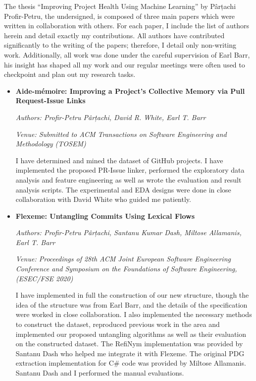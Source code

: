 The thesis “Improving Project Health Using Machine Learning” by Pârțachi
Profir-Petru, the undersigned, is composed of three main papers which were
written in collaboration with others. For each paper, I include the list of
authors herein and detail exactly my contributions. All authors have contributed
significantly to the writing of the papers; therefore, I detail only non-writing
work. Additionally, all work was done under the careful supervision of Earl
Barr, his insight has shaped all my work and our regular meetings were often
used to checkpoint and plan out my research tasks.

\begin{itemize}[leftmargin=*]
    \item[] \textbf{Aide-mémoire: Improving a Project’s Collective Memory via
Pull Request-Issue Links} 
    
    \noindent\emph{Authors: Profir-Petru Pârțachi, David R. White, Earl T. Barr}
    
    \noindent\emph{Venue: Submitted to ACM Transactions on Software Engineering
    and Methodology (TOSEM)}

    \noindent I have determined and mined the dataset of GitHub projects. I have
    implemented the proposed PR-Issue linker, performed the exploratory data
    analysis and feature engineering as well as wrote the evaluation and result
    analysis scripts. The experimental and EDA designs were done in close
    collaboration with David White who guided me patiently.

    \item[] \noindent\textbf{Flexeme: Untangling Commits Using Lexical Flows}
    
    \noindent\emph{Authors: Profir-Petru Pârțachi, Santanu Kumar Dash, Miltose
    Allamanis, Earl T. Barr}
    
    \noindent\emph{Venue: Proceedings of 28th ACM Joint European Software
    Engineering Conference and Symposium on the Foundations of Software
    Engineering, (ESEC/FSE 2020)}

    \noindent  I have implemented in full the construction of our new structure,
    though the idea of the structure was from Earl Barr, and the details of the
    specification were worked in close collaboration. I also implemented the
    necessary methods to construct the dataset, reproduced previous work in the
    area and implemented our proposed untangling algorithms as well as their
    evaluation on the constructed dataset. The RefiNym implementation was
    provided by Santanu Dash who helped me integrate it with Flexeme. The
    original PDG extraction implementation for C\# code was provided by Miltose
    Allamanis. Santanu Dash and I performed the manual evaluations.
    

\end{itemize}
